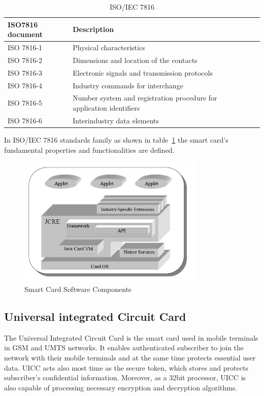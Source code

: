 \begin{table}[!htb]
\caption{ISO/IEC 7816\cite{handbuch}}
\centering
\begin{tabular}{lllll}
 ISO7816 document & Description  \\[1ex]
\hline\hline
 ISO 7816-1&Physical characteristics   \\
ISO 7816-2&Dimensions and location of the contacts   \\
 ISO 7816-3& Electronic signals and transmission protocols   \\
ISO 7816-4&Industry commands for interchange  \\
ISO 7816-5& Number system and registration procedure for application identifiers \\
ISO 7816-6& Interindustry data elements  \\
\hline
\end{tabular}
\label{table:ISO7816}
\end{table}

In ISO/IEC 7816 standards family as shown in table~\ref{table:ISO7816} the smart card's fundamental properties and functionalities are defined.

\begin{figure}[!htbp]
	\centering
	\includegraphics[width=0.8\textwidth]{scc.jpg}
		\caption{Smart Card Software Components\cite{jcadg}}
	\label{fig:scc}
\end{figure}

\subsection{Universal integrated Circuit Card}
The Universal Integrated Circuit Card is the smart card used in mobile terminals in GSM and UMTS networks. It enables authenticated subscriber to join the network with their mobile terminals and at the same time protects essential user data. UICC acts  also most time as the secure token, which stores and protects subscriber's confidential information. Moreover, as a 32bit processor, UICC is also capable of processing necessary  encryption and  decryption algorithms\cite{uiccDef}.

